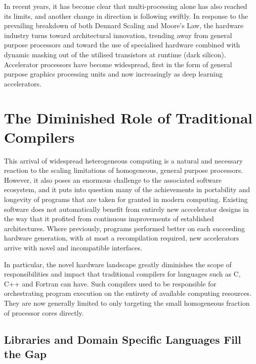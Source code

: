     In recent years, it has become clear that multi-processing alone has
    also reached its limits, and another change in direction is following
    swiftly.
    In response to the prevailing breakdown of both Dennard Scaling and Moore's
    Law, the hardware industry turns toward architectural innovation, trending
    away from general purpose processors and toward the use of specialised
    hardware combined with dynamic masking out of the utilised transistors
    at runtime (dark silicon).
    Accelerator processors have become widespread, first in the form of general
    purpose graphics processing units and now increasingly as deep learning
    accelerators.%

\section{The Diminished Role of Traditional Compilers}

    This arrival of widespread heterogeneous computing is a natural and
    necessary reaction to the scaling limitations of homogeneous, general
    purpose processors.
    However, it also poses an enormous challenge to the associated software
    ecosystem, and it puts into question many of the achievements in portability
    and longevity of programs that are taken for granted in modern computing.
    Existing software does not automatically benefit from entirely new
    acccelerator designs in the way that it profited from continuous
    improvements of established architectures.
    Where previously, programs performed better on each succeeding hardware
    generation, with at most a recompilation required, new accelerators arrive
    with novel and incompatible interfaces.

    In particular, the novel hardware landscape greatly diminishes the scope of
    responsibilities and impact that traditional compilers for languages such as
    C, C++ and Fortran can have.
    Such compilers used to be responsible for orchestrating
    program execution on the entirety of available computing resources.
    They are now generally limited to only targeting the small
    homogeneous fraction of processor cores directly.

\subsection{Libraries and Domain Specific Languages Fill the Gap}

